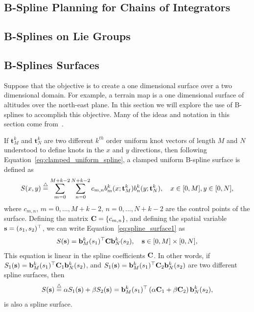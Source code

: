 \subsection{B-Spline Planning for Chains of Integrators}

\subsection{B-Splines on Lie Groups}

\subsection{B-Splines Surfaces}

Suppose that the objective is to create a one dimensional surface over a two dimensional domain.  For example, a terrain map is a one dimensional surface of altitudes over the north-east plane.  In this section we will explore the use of B-splines to accomplish this objective. Many of the ideas and notation in this section come from~\cite{RodriguesTsiogkasAguiar20}.

If $\mathbf{t}_M^k$ and $\mathbf{t}_N^k$ are two different $k^{th}$ order uniform knot vectors of length $M$ and $N$ understood to define knots in the $x$ and $y$ directions, then following Equation~\eqref{eq:clamped_uniform_spline}, a clamped uniform B-spline surface is defined as 
\begin{equation}\label{eq:spline_surface1}
S(x, y) \defeq \sum_{m=0}^{M+k-2} \sum_{n=0}^{N+k-2} c_{m,n} b^k_m(x; \mathbf{t}_M^k) b^k_n(y; \mathbf{t}_N^k), \quad x\in[0,M], y\in[0, N],
\end{equation}
where $c_{m, n}$, $m=0, \dots, M+k-2$, $n=0, \dots, N+k-2$ are the control points of the surface.  Defining the matrix $\mathbf{C}=\{c_{m,n}\}$, and defining the spatial variable $\mathbf{s} = (s_1, s_2)^\top$, we can write Equation~\eqref{eq:spline_surface1} as
\begin{equation}\label{eq:spline_surface2}
S(\sbf) = \bbf^k_M(s_1)^\top \Cbf \bbf^k_N(s_2), \quad \sbf\in[0, M]\times[0, N],
\end{equation}
This equation is linear in the spline coefficients $\mathbf{C}$.  In other words, if $S_1(\mathbf{s})=\mathbf{b}^k_M(s_1)^\top \mathbf{C}_1 \mathbf{b}^k_N(s_2)$, and $S_1(\mathbf{s})=\mathbf{b}^k_M(s_1)^\top \mathbf{C}_2 \mathbf{b}^k_N(s_2)$ are two different spline surfaces, then 
\[
S(\mathbf{s})\stackrel{\triangle}{=} \alpha S_1(\mathbf{s}) + \beta S_2(\mathbf{s}) = \mathbf{b}^k_M(s_1)^\top \left(\alpha\mathbf{C}_1 + \beta\mathbf{C}_2\right) \mathbf{b}^k_N(s_2),
\]
is also a spline surface.

